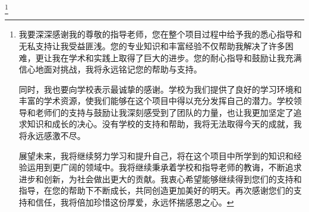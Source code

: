 \thanks{
我要深深感谢我的尊敬的指导老师，您在整个项目过程中给予我的悉心指导和无私支持让我受益匪浅。您的专业知识和丰富经验不仅帮助我解决了许多困难，更让我在学术和实践上取得了巨大的进步。您的耐心指导和鼓励让我充满信心地面对挑战，我将永远铭记您的帮助与支持。

同时，我也要向学校表示最诚挚的感谢。学校为我们提供了良好的学习环境和丰富的学术资源，使我们能够在这个项目中得以充分发挥自己的潜力。学校领导和老师们的支持与鼓励让我深刻感受到了团队的力量，也让我更加坚定了追求知识和成长的决心。没有学校的支持和帮助，我将无法取得今天的成就，我将永远感激不尽。


展望未来，我将继续努力学习和提升自己，将在这个项目中所学到的知识和经验运用到更广阔的领域中。我将继续秉承着学校和指导老师的教诲，不断追求进步和创新，为社会做出更大的贡献。我衷心希望能够继续得到您们的支持和指导，在您的帮助下不断成长，共同创造更加美好的明天。再次感谢您们的支持和信任，我将倍加珍惜这份厚爱，永远怀揣感恩之心。}